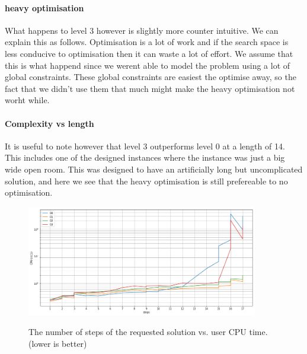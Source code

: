 \documentclass[british]{article}
\begin{document}
 \paragraph{heavy optimisation} What happens to level 3 however is slightly more counter intuitive. We can explain this as follows. Optimisation is a lot of work and if the search space is less conducive to optimisation then it can waste a lot of effort. We assume that this is what happend since we werent able to model the problem using a lot of global constraints. These global constraints are easiest the optimise away, so the fact that we didn't use them that much might make the heavy optimisation not worht while.
 
 \paragraph{Complexity vs length} It is useful to note however that level 3 outperforms level 0 at a length of 14. This includes one of the designed instances where the instance was just a big wide open room. This was designed to have an artificially long but uncomplicated solution, and here we see that the heavy optimisation is still prefereable to no optimisation.  
\begin{figure}[!ht]
	\centering
	\includegraphics[width=0.9\textwidth]{stepsVsCPUSec}
	\label{stepsVsCPUSec}
	\caption{The number of steps of the requested solution vs. user CPU time. (lower is better)}
\end{figure}
\end{document}
